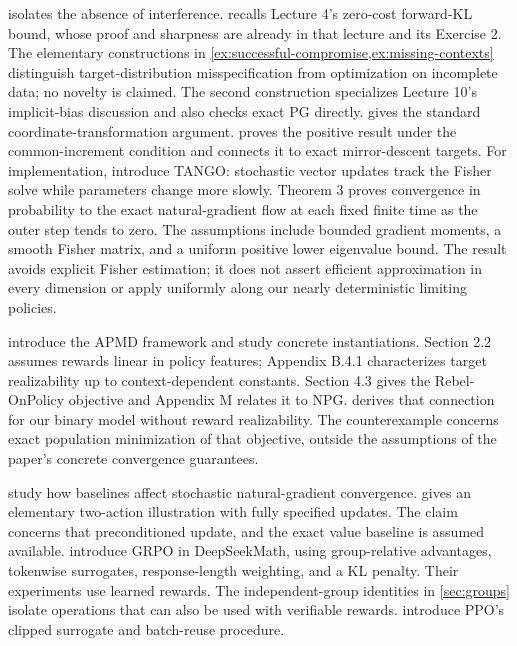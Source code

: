 \documentclass[11pt,twoside]{article}
\theoremstyle{definition}
\theoremstyle{remark}
\begin{document}
 isolates the absence of interference.
 recalls Lecture 4's zero-cost forward-KL
bound, whose proof and sharpness are already in that lecture and its
Exercise 2. The elementary constructions in
\cref{ex:successful-compromise,ex:missing-contexts} distinguish
target-distribution misspecification from optimization on incomplete data;
no novelty is claimed. The second construction specializes Lecture 10's
implicit-bias discussion and also checks exact PG directly.
 gives the standard coordinate-transformation
argument.  proves the positive result under the
common-increment condition and connects it to exact mirror-descent targets.
For implementation, \citet{ollivier2017} introduce TANGO: stochastic
vector updates track the Fisher solve while parameters change more slowly.
Theorem 3 proves convergence in probability to the exact natural-gradient
flow at each fixed finite time as the outer step tends to zero. The
assumptions include bounded gradient moments, a smooth Fisher matrix, and
a uniform positive lower eigenvalue bound. The result avoids explicit
Fisher estimation; it does not assert efficient approximation in every
dimension or apply uniformly along our nearly deterministic limiting
policies.

\citet{huang2026apmd} introduce the APMD framework and study concrete
instantiations. Section 2.2 assumes rewards linear in policy features;
Appendix B.4.1 characterizes target realizability up to context-dependent
constants. Section 4.3 gives the Rebel-OnPolicy objective and Appendix M
relates it to NPG.  derives that connection for our binary
model without reward realizability. The counterexample concerns exact
population minimization of that objective, outside the assumptions of the
paper's concrete convergence guarantees.

\citet{mei2022} study how baselines affect stochastic natural-gradient
convergence.  gives an elementary two-action
illustration with fully specified updates. The claim concerns that
preconditioned update, and the exact value baseline is assumed available.
\citet{shao2024} introduce GRPO in DeepSeekMath, using group-relative
advantages, tokenwise surrogates, response-length weighting, and a KL
penalty. Their experiments use learned rewards. The independent-group
identities in \cref{sec:groups} isolate operations that can also be used
with verifiable rewards. \citet{schulman2017} introduce PPO's clipped
surrogate and batch-reuse procedure.
\end{document}
